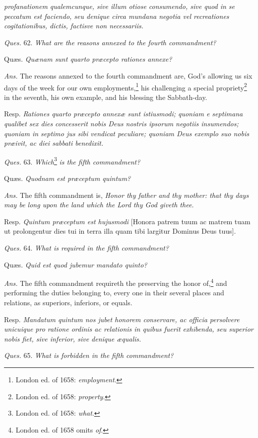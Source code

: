 \emph{profanationem qualemcunque, sive illum otiose consumendo, sive quod in se peccatum est faciendo, seu denique circa mundana negotia vel recreationes cogitationibus, dictis, factisve non necessariis.}

\emph{Ques.} 62. \emph{What are the reasons annexed to the fourth commandment?}

Quæs. \emph{Quænam sunt quarto præcepto rationes annexe?}

\emph{Ans.} The reasons annexed to the fourth commandment are, God's allowing us six days of the week for our own employments,\footnote{London ed. of 1658: \emph{employment}.} his challenging a special propriety\footnote{London ed. of 1658: \emph{property}.} in the seventh, his own example, and his blessing the Sabbath-day.

Resp. \emph{Rationes quarto præcepto annexæ sunt istiusmodi; quoniam e septimana qualibet sex dies concesserit nobis Deus nostris ipsorum negotiis insumendos; quoniam in septimo jus sibi vendicat peculiare; quoniam Deus exemplo suo nobis præivit, ac diei sabbati benedixit.}

\emph{Ques.} 63. \emph{Which}\footnote{London ed. of 1658: \emph{what}.} \emph{is the fifth commandment?}

Quæs. \emph{Quodnam est præceptum quintum?}

\emph{Ans.} The fifth commandment is, \emph{Honor thy father and thy mother: that thy days may be long upon the land which the Lord thy God giveth thee.}

Resp. \emph{Quintum præceptum est hujusmodi} [Honora patrem tuum ac matrem tuam ut prolongentur dies tui in terra illa quam tibi largitur Dominus Deus tuus].

\emph{Ques.} 64. \emph{What is required in the fifth commandment?}

Quæs. \emph{Quid est quod jubemur mandato quinto?}

\emph{Ans.} The fifth commandment requireth the preserving the honor of,\footnote{London ed. of 1658 omits \emph{of}.} and performing the duties belonging to, every one in their several places and relations, as superiors, inferiors, or equals.

Resp. \emph{Mandatum quintum nos jubet honorem conservare, ac officia persolvere unicuique pro ratione ordinis ac relationis in quibus fuerit exhibenda, seu superior nobis fiet, sive inferior, sive denique æqualis.}

\emph{Ques.} 65. \emph{What is forbidden in the fifth commandment?}

